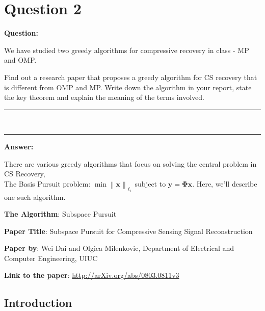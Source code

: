 \documentclass[fleqn, 11pt]{article}
\newcommand{\bs}[1]{\boldsymbol{#1}}
\newcommand\norm[1]{\left\lVert#1\right\rVert}
\newcommand{\HRule}{\rule{\linewidth}{0.5mm}}
\begin{document}
\section*{Question 2}
\setcounter{equation}{0}


\textbf{Question: }

\smallskip
We have studied two greedy algorithms for compressive recovery in class - MP and OMP.

\smallskip

Find out a research paper that proposes a greedy algorithm for CS recovery that is
different from OMP and MP. Write down the algorithm in your report, state the key theorem and explain the
meaning of the terms involved.

\vspace{10pt}

\begin{spacing}{0.05}
\noindent
\HRule\\
\HRule
\end{spacing}

\vspace{10pt}

\medskip

\textbf{\large Answer: }

\medskip

There are various greedy algorithms that focus on solving the central problem in CS Recovery, \\
The Basis Pursuit problem: $\min \norm{\bs{x}}_{\ell_1} $ subject to $\bs{y = \Phi x}$. 
Here, we'll describe one such algorithm.

\medskip

\textbf{The Algorithm}: Subspace Pursuit 

\medskip

\textbf{Paper Title}: Subspace Pursuit for Compressive Sensing Signal
Reconstruction

\medskip

\textbf{Paper by}: Wei Dai and Olgica Milenkovic, 
Department of Electrical and Computer Engineering, UIUC

\medskip

\textbf{Link to the paper}: \url{http://arXiv.org/abs/0803.0811v3}

\hrulefill

\subsection*{Introduction}
\end{document}
